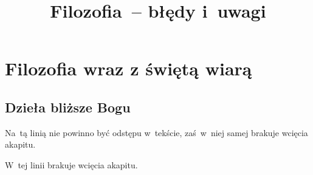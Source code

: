 \documentclass[a4paper,11pt]{article}
\title{Filozofia~-- błędy i~uwagi}
\begin{document}





\maketitle  %





\section{Filozofia wraz z świętą wiarą}











\subsection{Dzieła bliższe Bogu}

\vspace{\spaceTwo}







\start {} Na~tą linią nie powinno być odstępu w~tekście,
zaś~w~niej samej brakuje wcięcia akapitu.

\vspace{\spaceFour}





\start {} W~tej linii brakuje wcięcia akapitu.

\vspace{\spaceFour}
\end{document}
